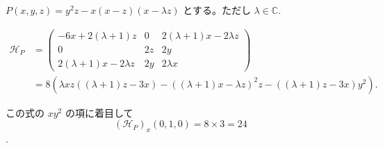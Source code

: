 \documentclass{jsarticle}
\begin{document}
    
    $P(x, y, z) = y^2z - x(x-z)(x-\lambda z)$ とする。ただし $\lambda \in \mathbb{C}$.
    
    \begin{align*}
        \mathcal{H}_P & = \begin{pmatrix}
            -6x + 2(\lambda + 1)z & 0 & 2(\lambda+1)x-2\lambda z\\
            0 & 2z & 2y\\
            2(\lambda+1)x-2\lambda z & 2y & 2\lambda x
        \end{pmatrix}\\
        & = 8(\lambda xz((\lambda+1)z-3x) - ((\lambda+1)x - \lambda z)^2z - ((\lambda+1)z-3x)y^2).
    \end{align*}
    
    この式の $xy^2$ の項に着目して
    $$(\mathcal{H}_P)_x(0,1,0) = 8 \times 3 = 24$$.
    
\end{document}
